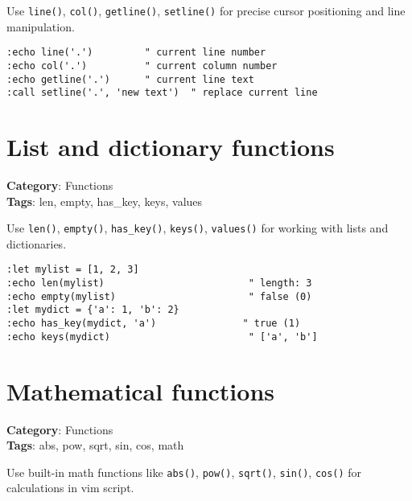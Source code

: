 {Use {\footnotesize \Verb§line()§}, {\footnotesize \Verb§col()§}, {\footnotesize \Verb§getline()§}, {\footnotesize \Verb§setline()§} for precise cursor positioning and line manipulation.

\begin{Exa*}{}
\begin{Verbatim}[fontsize=\footnotesize, breaklines, breakanywhere]
:echo line('.')         " current line number
:echo col('.')          " current column number
:echo getline('.')      " current line text
:call setline('.', 'new text')  " replace current line
\end{Verbatim}
\end{Exa*}

\section{List and dictionary functions}

\textbf{Category}: Functions\\ \textbf{Tags}: len, empty, has\_key, keys, values
\vspace{0.5cm}

Use {\footnotesize \Verb§len()§}, {\footnotesize \Verb§empty()§}, {\footnotesize \Verb§has_key()§}, {\footnotesize \Verb§keys()§}, {\footnotesize \Verb§values()§} for working with lists and dictionaries.

\begin{Exa*}{}
\begin{Verbatim}[fontsize=\footnotesize, breaklines, breakanywhere]
:let mylist = [1, 2, 3]
:echo len(mylist)                         " length: 3
:echo empty(mylist)                       " false (0)
:let mydict = {'a': 1, 'b': 2}
:echo has_key(mydict, 'a')               " true (1)
:echo keys(mydict)                        " ['a', 'b']
\end{Verbatim}
\end{Exa*}

\section{Mathematical functions}

\textbf{Category}: Functions\\ \textbf{Tags}: abs, pow, sqrt, sin, cos, math
\vspace{0.5cm}

Use built-in math functions like {\footnotesize \Verb§abs()§}, {\footnotesize \Verb§pow()§}, {\footnotesize \Verb§sqrt()§}, {\footnotesize \Verb§sin()§}, {\footnotesize \Verb§cos()§} for calculations in vim script.

}
